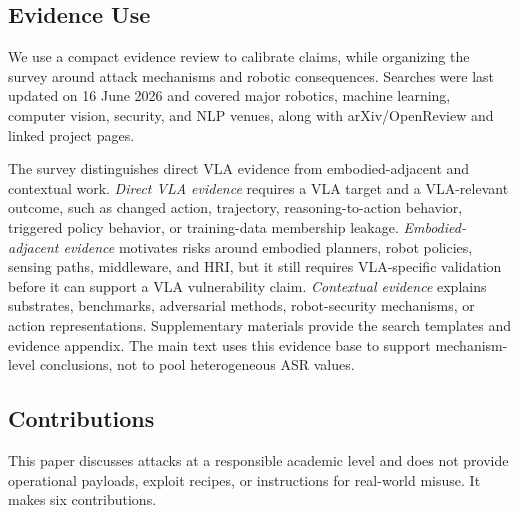 \subsection{Evidence Use}
\label{subsec:evidence-use}

We use a compact evidence review to calibrate claims, while organizing the survey around attack mechanisms and robotic consequences. Searches were last updated on 16 June 2026 and covered major robotics, machine learning, computer vision, security, and NLP venues, along with arXiv/OpenReview and linked project pages.

The survey distinguishes direct VLA evidence from embodied-adjacent and contextual work. \emph{Direct VLA evidence} requires a VLA target and a VLA-relevant outcome, such as changed action, trajectory, reasoning-to-action behavior, triggered policy behavior, or training-data membership leakage. \emph{Embodied-adjacent evidence} motivates risks around embodied planners, robot policies, sensing paths, middleware, and HRI, but it still requires VLA-specific validation before it can support a VLA vulnerability claim. \emph{Contextual evidence} explains substrates, benchmarks, adversarial methods, robot-security mechanisms, or action representations. Supplementary materials provide the search templates and evidence appendix. The main text uses this evidence base to support mechanism-level conclusions, not to pool heterogeneous ASR values.

\subsection{Contributions}

This paper discusses attacks at a responsible academic level and does not provide operational payloads, exploit recipes, or instructions for real-world misuse. It makes six contributions.

